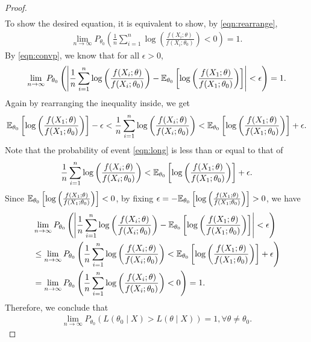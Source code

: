 \begin{proof}
\begin{align}
\end{align}
To show the desired equation, it is equivalent to show, by \cref{eqn:rearrange},
\begin{align}
\lim_{n\to\infty}P_{\theta_0}\left( \frac{1}{n}\sum_{i=1}^n\log\left( \frac{f(X_i;\theta)}{f(X_i;\theta_0)} \right) < 0 \right) = 1.
\end{align}
By \cref{eqn:convp}, we know that for all $\epsilon > 0$,
\begin{align}
\lim_{n\to\infty}P_{\theta_0}\left( \left| \frac{1}{n}\sum_{i=1}^n\log\left( \frac{f(X_i;\theta)}{f(X_i;\theta_0)} \right) - \mathbb{E}_{\theta_0}\left[ \log \left( \frac{f(X_1; \theta)}{f(X_1; \theta_0)} \right) \right] \right| < \epsilon \right) = 1.
\end{align}
Again by rearranging the inequality inside, we get
\begin{align}
\mathbb{E}_{\theta_0}\left[ \log \left( \frac{f(X_1; \theta)}{f(X_1; \theta_0)} \right) \right] - \epsilon < \frac{1}{n}\sum_{i=1}^n\log\left( \frac{f(X_i;\theta)}{f(X_i;\theta_0)} \right) < \mathbb{E}_{\theta_0}\left[ \log \left( \frac{f(X_1; \theta)}{f(X_1; \theta_0)} \right) \right] + \epsilon. \label{eqn:long}
\end{align}
Note that the probability of event \cref{eqn:long} is less than or equal to that of
\begin{align}
\frac{1}{n}\sum_{i=1}^n\log\left( \frac{f(X_i;\theta)}{f(X_i;\theta_0)} \right) < \mathbb{E}_{\theta_0}\left[ \log \left( \frac{f(X_1; \theta)}{f(X_1; \theta_0)} \right) \right] + \epsilon.
\end{align}
Since $\mathbb{E}_{\theta_0}\left[ \log \left( \frac{f(X_1; \theta)}{f(X_1; \theta_0)} \right) \right] < 0$, by fixing $\epsilon = -\mathbb{E}_{\theta_0}\left[ \log \left( \frac{f(X_1; \theta)}{f(X_1; \theta_0)} \right) \right] > 0$, we have
\begin{align}
&\lim_{n\to\infty}P_{\theta_0}\left( \left| \frac{1}{n}\sum_{i=1}^n\log\left( \frac{f(X_i;\theta)}{f(X_i;\theta_0)} \right) - \mathbb{E}_{\theta_0}\left[ \log \left( \frac{f(X_1; \theta)}{f(X_1; \theta_0)} \right) \right] \right| < \epsilon \right)\\
&\leq \lim_{n\to\infty}P_{\theta_0}\left( \frac{1}{n}\sum_{i=1}^n\log\left( \frac{f(X_i;\theta)}{f(X_i;\theta_0)} \right) < \mathbb{E}_{\theta_0}\left[ \log \left( \frac{f(X_1; \theta)}{f(X_1; \theta_0)} \right) \right] + \epsilon \right)\\
&= \lim_{n\to\infty}P_{\theta_0}\left( \frac{1}{n}\sum_{i=1}^n\log\left( \frac{f(X_i;\theta)}{f(X_i;\theta_0)} \right) < 0 \right) = 1.
\end{align}
Therefore, we conclude that
\begin{align}
\lim_{n\to\infty} P_{\theta_0}\left( L(\theta_0 \mid X) > L(\theta \mid X) \right) = 1, \forall \theta \neq \theta_0.
\end{align}
\end{proof}
